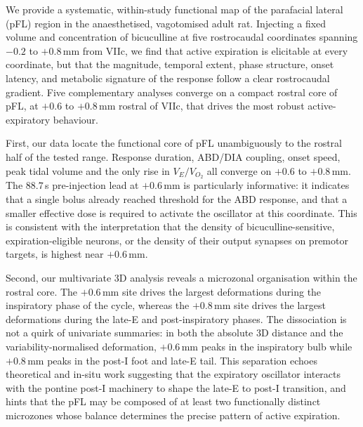 \documentclass[11pt]{article}
\begin{document}
We provide a systematic, within-study functional map of the parafacial
lateral (pFL) region in the anaesthetised, vagotomised adult rat.
Injecting a fixed volume and concentration of bicuculline at five
rostrocaudal coordinates spanning $-0.2$ to $+0.8$\,mm from VIIc, we
find that active expiration is elicitable at every coordinate, but that
the magnitude, temporal extent, phase structure, onset latency, and
metabolic signature of the response follow a clear rostrocaudal
gradient. Five complementary analyses converge on a compact rostral
core of pFL, at $+0.6$ to $+0.8$\,mm rostral of VIIc, that drives the
most robust active-expiratory behaviour.

First, our data locate the functional core of pFL unambiguously to the
rostral half of the tested range. Response duration, ABD/DIA coupling,
onset speed, peak tidal volume and the only rise in $V_E/V_{O_2}$ all
converge on $+0.6$ to $+0.8$\,mm. The $88.7$\,s pre-injection lead at
$+0.6$\,mm is particularly informative: it indicates that a single bolus
already reached threshold for the ABD response, and that a smaller
effective dose is required to activate the oscillator at this coordinate.
This is consistent with the interpretation that the density of
bicuculline-sensitive, expiration-eligible neurons, or the density of
their output synapses on premotor targets, is highest near $+0.6$\,mm.

Second, our multivariate 3D analysis reveals a microzonal organisation
within the rostral core. The $+0.6$\,mm site drives the largest
deformations during the inspiratory phase of the cycle, whereas the
$+0.8$\,mm site drives the largest deformations during the late-E and
post-inspiratory phases. The dissociation is not a quirk of univariate
summaries: in both the absolute 3D distance and the
variability-normalised deformation, $+0.6$\,mm peaks in the inspiratory
bulb while $+0.8$\,mm peaks in the post-I foot and late-E tail. This
separation echoes theoretical
\citep{Molkov2010Computational,Barnett2017Partial} and in-situ
\citep{Abdala2009Abdominal,Dhingra2020LateE} work suggesting that the
expiratory oscillator interacts with the pontine post-I machinery
\citep{Dutschmann2006Pontine} to shape the late-E to post-I transition,
and hints that the pFL may be composed of at least two functionally
distinct microzones whose balance determines the precise pattern of
active expiration.
\end{document}
